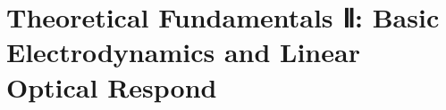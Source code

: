 \chapter{Theoretical Fundamentals Ⅱ: Basic Electrodynamics and Linear Optical Respond\label{cha:fundamentals_b}}
